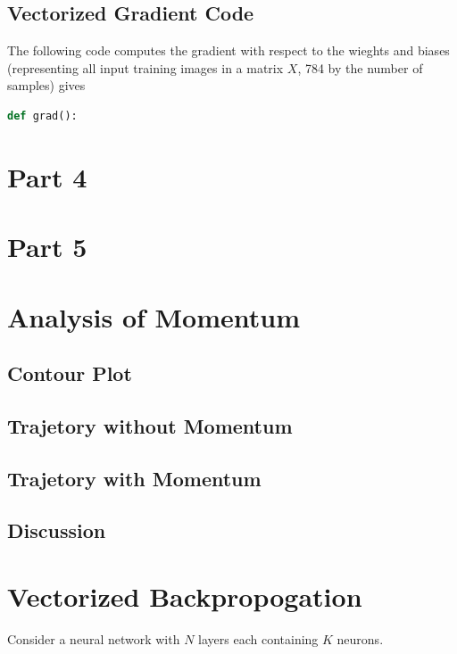 \documentclass{article}
\begin{document}
   \subsection{Vectorized Gradient Code}
   The following code computes the gradient with respect to the wieghts and biases
   (representing all input training images in a matrix $X$, 784 by the number of samples) gives
      \begin{lstlisting}[language=Python]
         def grad():
      \end{lstlisting}


   \section{Part 4}

   \section{Part 5}

   \section{Analysis of Momentum}
   \subsection{Contour Plot}

   \subsection{Trajetory without Momentum}

   \subsection{Trajetory with Momentum}

   \subsection{Discussion}




   \section{Vectorized Backpropogation}
   Consider a neural network with $N$ layers each containing $K$ neurons.
\end{document}
